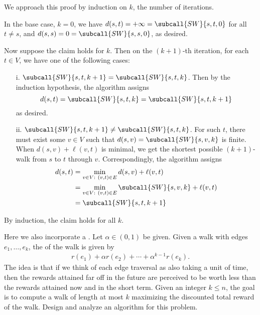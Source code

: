 \documentclass{article}
\begin{document}
\begin{solution}
\begin{subproof}[Correctness.]
We approach this proof by induction on $k$, the number of iterations.

In the base case, $k=0$, we have $d(s,t) = +\infty = \subcall{SW}{s,t,0}$ for all $t \not= s$, and $d(s,s) = 0 = \subcall{SW}{s,s,0}$, as desired.

Now suppose the claim holds for $k$. Then on the $(k+1)$-th iteration, for each $t \in V$, we have one of the following cases:
\begin{enumerate}
    \item [i.] $\subcall{SW}{s,t,k+1} = \subcall{SW}{s,t,k}$. Then by the induction hypothesis, the algorithm assigns \[d(s,t)= \subcall{SW}{s,t,k} = \subcall{SW}{s,t,k+1}\]as desired.

    \item [ii.] $\subcall{SW}{s,t,k+1} \not= \subcall{SW}{s,t,k}$.
    For such $t$, there must exist some $v \in V$ such that $d(s,v)=\subcall{SW}{s,v,k}$ is finite. When $d(s,v) + \ell(v,t)$ is minimal, we get the shortest possible $(k+1)$-walk from $s$ to $t$ through $v$.
    Correspondingly, the algorithm assigns
    \begin{align*}
        d(s,t)
        &= \min_{v \in V: \ (v,t) \in E} d(s,v) + \ell(v,t) \\
        &= \min_{v \in V: \ (v,t) \in E} \subcall{SW}{s,v,k} + \ell(v,t) \\
        &= \subcall{SW}{s,t,k+1}
    \end{align*}
\end{enumerate}
By induction, the claim holds for all $k$.
\end{subproof}
\end{solution}

\pagebreak


\begin{subexercise}
  Here we also incorporate a .
  Let $ \alpha\in (0,1) $ be given.
  Given a walk with edges $e_1,\ldots, e_k$, the  of the walk is given by
  \begin{align*}
    r(e_1)+\alpha r(e_2) + \cdots + \alpha^{k-1}r(e_k).
  \end{align*}
  The idea is that if we think of each edge traversal as also taking a unit of time, then the rewards attained far off in the future are perceived to be worth less than the rewards attained now and in the short term.
  Given an integer $k \leq n$, the goal is to compute a walk of length at most $k$ maximizing the discounted total reward of the walk.
  Design and analyze an algorithm for this problem.
\end{subexercise}
\end{document}
